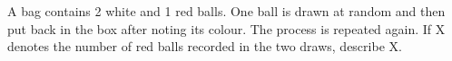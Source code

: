 \begin{flushleft}
A bag contains 2 white and 1 red balls. One ball is drawn at random and then put back in
the box after noting its colour. The process is repeated again. If X denotes the number of
red balls recorded in the two draws, describe X.
\end{flushleft}